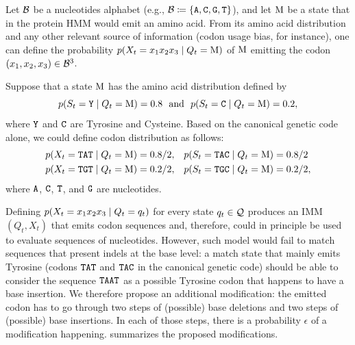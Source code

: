 Let $\mathcal{B}$ be a nucleotides alphabet (e.g., $\mathcal{B} \coloneqq \{\mathtt{A}, \mathtt{C}, \mathtt{G},
\mathtt{T}\}$), and let $\mathrm{M}$ be a state that in the protein HMM would emit an amino acid. From
its amino acid distribution and any other relevant source of information (codon usage bias, for
instance), one can define the probability $p(X_t=x_1x_2x_3 \;|\; Q_t=\mathrm{M})$ of $\mathrm{M}$
emitting the codon $(x_1, x_2, x_3) \in \mathcal{B}^3$.

\begin{example}
  Suppose that a state $\mathrm{M}$ has the amino acid distribution defined by
  \begin{equation*}
    p(S_t=\mathtt{Y} \;|\; Q_t=\mathrm{M}) = 0.8 ~~\text{and}~~ p(S_t=\mathtt{C} \;|\; Q_t=\mathrm{M}) = 0.2,
  \end{equation*}
  where $\mathtt{Y}$ and $\mathtt{C}$ are Tyrosine and Cysteine.
  Based on the canonical genetic code alone, we could define codon distribution as follows:
  \begin{equation*}
    \begin{split}
      p(X_t=\mathtt{TAT}\;|\; Q_t=\mathrm{M})= 0.8/2, &\quad p(S_t=\mathtt{TAC}\;|\; Q_t=\mathrm{M})=0.8/2\\
      p(X_t=\mathtt{TGT}\;|\; Q_t=\mathrm{M})= 0.2/2, &\quad p(S_t=\mathtt{TGC}\;|\; Q_t=\mathrm{M})=0.2/2,
    \end{split}
  \end{equation*}
  where $\mathtt{A}$, $\mathtt{C}$, $\mathtt{T}$, and $\mathtt{G}$ are nucleotides.
\end{example}

Defining $p(X_t=x_1x_2x_3 \;|\; Q_t=q_t)$ for every state $q_t \in \mathcal{Q}$ produces an IMM $(Q_t,
X_t)$ that emits codon sequences and, therefore, could in principle be used to evaluate sequences of
nucleotides. However, such model would fail to match sequences that present indels at the base
level: a match state that mainly emits Tyrosine (codons $\mathtt{TAT}$ and $\mathtt{TAC}$ in the canonical
genetic code) should be able to consider the sequence $\mathtt{TAAT}$ as a possible Tyrosine codon that
happens to have a base insertion. We therefore propose an additional modification: the emitted codon
has to go through two steps of (possible) base deletions and two steps of (possible) base insertions. In
each of those steps, there is a probability $\epsilon$ of a modification happening.
 summarizes the proposed modifications.

